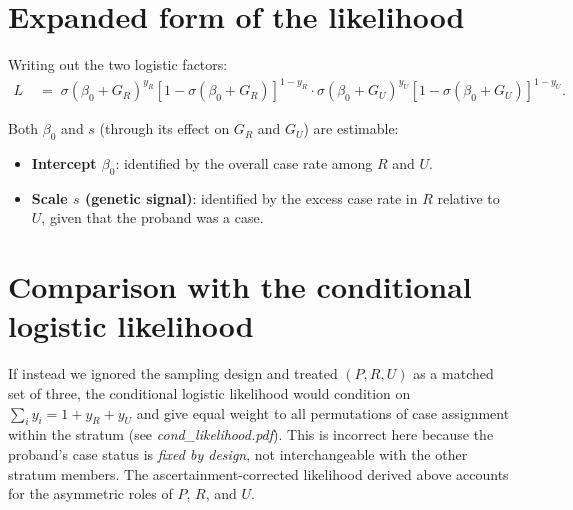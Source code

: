 \documentclass[12pt]{article}
\begin{document}
\section*{Expanded form of the likelihood}

Writing out the two logistic factors:
\begin{align}
  L
  &\;=\;
  \sigma(\beta_0 + G_R)^{y_R}
  \left[1 - \sigma(\beta_0 + G_R)\right]^{1-y_R}
  \cdot
  \sigma(\beta_0 + G_U)^{y_U}
  \left[1 - \sigma(\beta_0 + G_U)\right]^{1-y_U}.
\end{align}

Both $\beta_0$ and $s$ (through its effect on $G_R$ and $G_U$) are
estimable:
\begin{itemize}
  \item \textbf{Intercept $\beta_0$}: identified by the overall case rate among
        $R$ and $U$.
  \item \textbf{Scale $s$ (genetic signal)}: identified by the excess case rate
        in $R$ relative to $U$, given that the proband was a case.
\end{itemize}

\section*{Comparison with the conditional logistic likelihood}

If instead we ignored the sampling design and treated $(P, R, U)$ as a
matched set of three, the conditional logistic likelihood would condition on
$\sum_i y_i = 1 + y_R + y_U$ and give equal weight to all permutations of
case assignment within the stratum (see \textit{cond\_likelihood.pdf}).  This
is incorrect here because the proband's case status is \emph{fixed by design},
not interchangeable with the other stratum members.  The ascertainment-corrected
likelihood derived above accounts for the asymmetric roles of $P$, $R$, and $U$.
\end{document}
